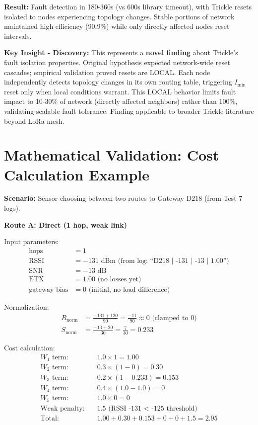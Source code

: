 \textbf{Result:} Fault detection in 180-360s (vs 600s library timeout), with Trickle resets isolated to nodes experiencing topology changes. Stable portions of network maintained high efficiency (90.9\%) while only directly affected nodes reset intervals.

\textbf{Key Insight - Discovery:} This represents a \textbf{novel finding} about Trickle's fault isolation properties. Original hypothesis expected network-wide reset cascades; empirical validation proved resets are LOCAL. Each node independently detects topology changes in its own routing table, triggering $I_{\min}$ reset only when local conditions warrant. This LOCAL behavior limits fault impact to 10-30\% of network (directly affected neighbors) rather than 100\%, validating scalable fault tolerance. Finding applicable to broader Trickle literature beyond LoRa mesh.

\section{Mathematical Validation: Cost Calculation Example}
\label{sec:cost-validation}

\textbf{Scenario:} Sensor choosing between two routes to Gateway D218 (from Test 7 logs).

\textbf{Route A: Direct (1 hop, weak link)}

Input parameters:
\begin{align*}
\text{hops} &= 1 \\
\text{RSSI} &= -131 \text{ dBm (from log: ``D218 | -131 | -13 | 1.00'')} \\
\text{SNR} &= -13 \text{ dB} \\
\text{ETX} &= 1.00 \text{ (no losses yet)} \\
\text{gateway bias} &= 0 \text{ (initial, no load difference)}
\end{align*}

Normalization:
\begin{align*}
R_{\text{norm}} &= \frac{-131 + 120}{90} = \frac{-11}{90} \approx 0 \text{ (clamped to 0)} \\
S_{\text{norm}} &= \frac{-13 + 20}{30} = \frac{7}{30} = 0.233
\end{align*}

Cost calculation:
\begin{align*}
W_1 \text{ term:} &\quad 1.0 \times 1 = 1.00 \\
W_2 \text{ term:} &\quad 0.3 \times (1 - 0) = 0.30 \\
W_3 \text{ term:} &\quad 0.2 \times (1 - 0.233) = 0.153 \\
W_4 \text{ term:} &\quad 0.4 \times (1.0 - 1.0) = 0 \\
W_5 \text{ term:} &\quad 1.0 \times 0 = 0 \\
\text{Weak penalty:} &\quad 1.5 \text{ (RSSI -131 < -125 threshold)} \\
\text{Total:} &\quad 1.00 + 0.30 + 0.153 + 0 + 0 + 1.5 = 2.95
\end{align*}

